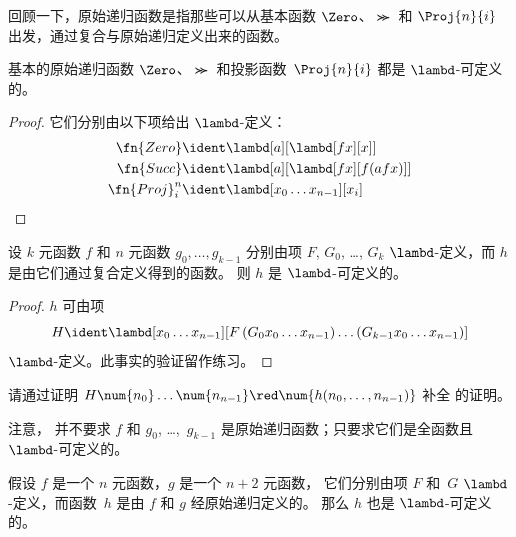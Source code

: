 \documentclass[../../../include/open-logic-section]{subfiles}
\begin{document}

回顾一下，原始递归函数是指那些可以从基本函数 $\Zero$、$\Succ$ 和 $\Proj{n}{i}$
出发，通过复合与原始递归定义出来的函数。

\begin{lem}
  基本的原始递归函数 $\Zero$、$\Succ$ 和投影函数~$\Proj{n}{i}$ 都是 $\lambd$-可定义的。
\end{lem}

\begin{proof}
它们分别由以下项给出 $\lambd$-定义：
\begin{align*}
  \fn{Zero} & \ident \lambd[a][\lambd[fx][x]]\\
  \fn{Succ} & \ident \lambd[a][\lambd[fx][f (a f x)]] \\
  \fn{Proj}^n_i & \ident \lambd[x_0\dots x_{n-1}][x_i]
\end{align*}
\end{proof}

\begin{lem}
   设 $k$ 元函数 $f$ 和 $n$ 元函数 $g_0, \dots, g_{k-1}$ 分别由项
  $F$, $G_0$, \dots, $G_k$ $\lambd$-定义，而 $h$ 是由它们通过复合定义得到的函数。
  则 $h$ 是 $\lambd$-可定义的。
\end{lem}

\begin{proof}
  $h$ 可由项
  \[
  H \ident \lambd[x_0 \dots x_{n-1}][F\, (G_0 x_0 \dots
    x_{n-1}) \dots (G_{k-1} x_0 \dots x_{n-1})]
  \]
  $\lambd$-定义。此事实的验证留作练习。
\end{proof}

\begin{prob}
  请通过证明 $H\num{n_0}\dots\num{n_{n-1}} \red \num{h(n_0, \dots,
    n_{n-1})}$ 补全  的证明。
\end{prob}

注意， 并不要求 $f$ 和 $g_0$, \dots,~$g_{k-1}$ 是原始递归函数；只要求它们是全函数且 $\lambd$-可定义的。

\begin{lem}
  假设 $f$ 是一个 $n$ 元函数，$g$ 是一个 $n+2$ 元函数，
  它们分别由项 $F$ 和~$G$ $\lambd$-定义，而函数~$h$ 是由 $f$ 和 $g$ 经原始递归定义的。
  那么 $h$ 也是 $\lambd$-可定义的。
\end{lem}
\end{document}
